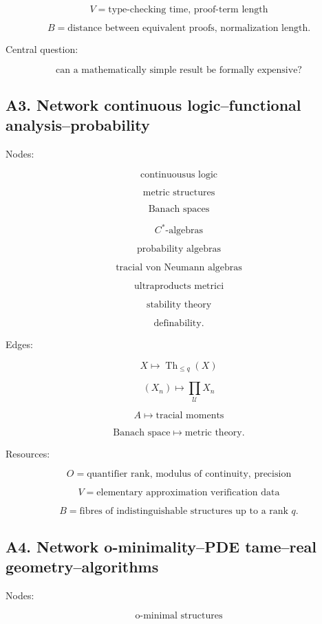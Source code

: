 \documentclass[11pt]{article}
\begin{document}
\[
V=\text{type-checking time, proof-term length}
\]

\[
B=\text{distance between equivalent proofs, normalization length}.
\]

Central question:

\[
\text{can a mathematically simple result be formally expensive?}
\]



\subsection{A3. Network continuous logic--functional analysis--probability}

Nodes:

\[
\text{continuousus logic}
\]

\[
\text{metric structures}
\]

\[
\text{Banach spaces}
\]

\[
C^\ast\text{-algebras}
\]

\[
\text{probability algebras}
\]

\[
\text{tracial von Neumann algebras}
\]

\[
\text{ultraproducts metrici}
\]

\[
\text{stability theory}
\]

\[
\text{definability}.
\]

Edges:

\[
X\mapsto \operatorname{Th}_{\le q}(X)
\]

\[
(X_n)\mapsto\prod_{\mathcal U}X_n
\]

\[
A\mapsto \text{tracial moments}
\]

\[
\text{Banach space}\mapsto \text{metric theory}.
\]

Resources:

\[
O=\text{quantifier rank, modulus of continuity, precision}
\]

\[
V=\text{elementary approximation verification data}
\]

\[
B=\text{fibres of indistinguishable structures up to a rank }q.
\]



\subsection{A4. Network o-minimality--PDE tame--real geometry--algorithms}

Nodes:

\[
\text{o-minimal structures}
\]
\end{document}
